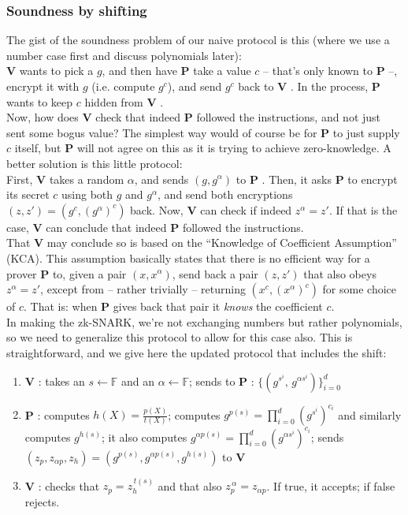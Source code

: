 \documentclass[11pt,oneside]{article}
\newcommand{\bP}{\textbf{P} }
\newcommand{\bV}{\textbf{V} }
\theoremstyle{definition}
\theoremstyle{remark}
\numberwithin{equation}{section}
\begin{document}
\subsubsection{Soundness by shifting}

The gist of the soundness problem of our naive protocol is this (where we use a number case first and discuss polynomials later):\\
\indent \bV wants to pick a $g$, and then have \bP take a value $c$ -- that's only known to \bP --, encrypt it with $g$ (i.e. compute $g^c$), and send $g^c$ back to \bV\!\!. In the process, \bP wants to keep $c$ hidden from \bV\!\!.\\
Now, how does \bV check that indeed \bP followed the instructions, and not just sent some bogus value? The simplest way would of course be for \bP to just supply $c$ itself, but \bP will not agree on this as it is trying to achieve zero-knowledge. A better solution is this little protocol:\\
First, \bV takes a random $\alpha$, and sends $(g,g^\alpha)$ to \bP. Then, it asks \bP to encrypt its secret $c$ using both $g$ and $g^\alpha$, and send both encryptions $(z,z')=(g^c,\left(g^{\alpha}\right)^c)$ back. Now, \bV can check if indeed $z^\alpha=z'$. If that is the case, \bV can conclude that indeed \bP followed the instructions.\\
That \bV may conclude so is based on the ``Knowledge of Coefficient Assumption'' (KCA). This assumption basically states that there is no efficient way for a prover \bP to, given a pair $(x,x^\alpha)$, send back a pair $(z,z')$ that also obeys $z^\alpha=z'$, except from -- rather trivially -- returning $(x^c,\left(x^\alpha\right)^c)$ for some choice of $c$. That is: when \bP gives back that pair it \emph{knows} the coefficient $c$.\\
\newline
In making the zk-SNARK, we're not exchanging numbers but rather polynomials, so we need to generalize this protocol to allow for this case also. This is straightforward, and we give here the updated protocol that includes the shift:
\begin{enumerate}
	\item \bV: takes an $s\leftarrow\mathbb{F}$ and an  $\alpha\leftarrow\mathbb{F}$; sends to \bP: $\{(g^{s^i}\!,\, g^{\alpha s^i})\}_{i=0}^{d}$
	\item  \bP: computes $h(X)=\frac{p(X)}{t(X)}$; computes $g^{p(s)}=\prod\limits_{i=0}^d\left(g^{s^i}\right)^{c_i}$ and similarly computes $g^{h(s)}$; it also computes $g^{\alpha p(s)}=\prod\limits_{i=0}^d\left(g^{\alpha s^i}\right)^{c_i}$; sends $(z_p,z_{\alpha p},z_h)=(g^{p(s)},g^{\alpha p(s)},g^{h(s)})$ to \bV
	\item \bV: checks that $z_p=z_h^{\,t(s)}$ and that also $z_p^{\,\alpha}=z_{\alpha p}$. If true, it accepts; if false rejects.
\end{enumerate}
\end{document}
